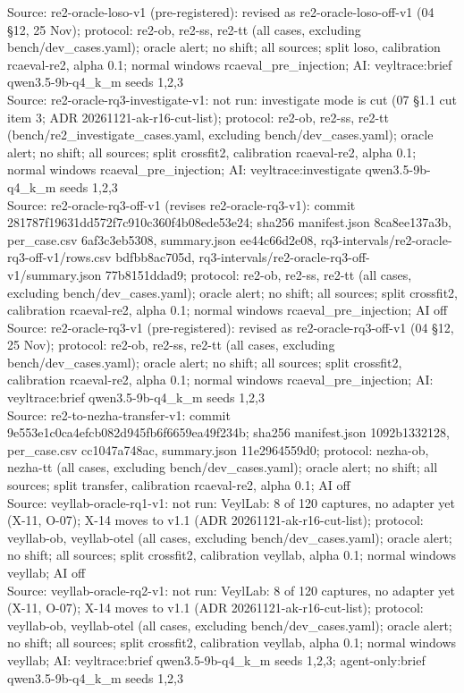 \begin{table}[t]
Source: re2-oracle-loso-v1 (pre-registered): revised as re2-oracle-loso-off-v1 (04 \S{}12, 25 Nov); protocol: re2-ob, re2-ss, re2-tt (all cases, excluding bench/dev\_cases.yaml); oracle alert; no shift; all sources; split loso, calibration rcaeval-re2, alpha 0.1; normal windows rcaeval\_pre\_injection; AI: veyltrace:brief qwen3.5-9b-q4\_k\_m seeds 1,2,3\\
Source: re2-oracle-rq3-investigate-v1: not run: investigate mode is cut (07 \S{}1.1 cut item 3; ADR 20261121-ak-r16-cut-list); protocol: re2-ob, re2-ss, re2-tt (bench/re2\_investigate\_cases.yaml, excluding bench/dev\_cases.yaml); oracle alert; no shift; all sources; split crossfit2, calibration rcaeval-re2, alpha 0.1; normal windows rcaeval\_pre\_injection; AI: veyltrace:investigate qwen3.5-9b-q4\_k\_m seeds 1,2,3\\
Source: re2-oracle-rq3-off-v1 (revises re2-oracle-rq3-v1): commit 281787f19631dd572f7c910c360f4b08ede53e24; sha256 manifest.json 8ca8ee137a3b, per\_case.csv 6af3c3eb5308, summary.json ee44c66d2e08, rq3-intervals/re2-oracle-rq3-off-v1/rows.csv bdfbb8ac705d, rq3-intervals/re2-oracle-rq3-off-v1/summary.json 77b8151ddad9; protocol: re2-ob, re2-ss, re2-tt (all cases, excluding bench/dev\_cases.yaml); oracle alert; no shift; all sources; split crossfit2, calibration rcaeval-re2, alpha 0.1; normal windows rcaeval\_pre\_injection; AI off\\
Source: re2-oracle-rq3-v1 (pre-registered): revised as re2-oracle-rq3-off-v1 (04 \S{}12, 25 Nov); protocol: re2-ob, re2-ss, re2-tt (all cases, excluding bench/dev\_cases.yaml); oracle alert; no shift; all sources; split crossfit2, calibration rcaeval-re2, alpha 0.1; normal windows rcaeval\_pre\_injection; AI: veyltrace:brief qwen3.5-9b-q4\_k\_m seeds 1,2,3\\
Source: re2-to-nezha-transfer-v1: commit 9e553e1c0ca4efcb082d945fb6f6659ea49f234b; sha256 manifest.json 1092b1332128, per\_case.csv cc1047a748ac, summary.json 11e2964559d0; protocol: nezha-ob, nezha-tt (all cases, excluding bench/dev\_cases.yaml); oracle alert; no shift; all sources; split transfer, calibration rcaeval-re2, alpha 0.1; AI off\\
Source: veyllab-oracle-rq1-v1: not run: VeylLab: 8 of 120 captures, no adapter yet (X-11, O-07); X-14 moves to v1.1 (ADR 20261121-ak-r16-cut-list); protocol: veyllab-ob, veyllab-otel (all cases, excluding bench/dev\_cases.yaml); oracle alert; no shift; all sources; split crossfit2, calibration veyllab, alpha 0.1; normal windows veyllab; AI off\\
Source: veyllab-oracle-rq2-v1: not run: VeylLab: 8 of 120 captures, no adapter yet (X-11, O-07); X-14 moves to v1.1 (ADR 20261121-ak-r16-cut-list); protocol: veyllab-ob, veyllab-otel (all cases, excluding bench/dev\_cases.yaml); oracle alert; no shift; all sources; split crossfit2, calibration veyllab, alpha 0.1; normal windows veyllab; AI: veyltrace:brief qwen3.5-9b-q4\_k\_m seeds 1,2,3; agent-only:brief qwen3.5-9b-q4\_k\_m seeds 1,2,3\\
\end{table}
